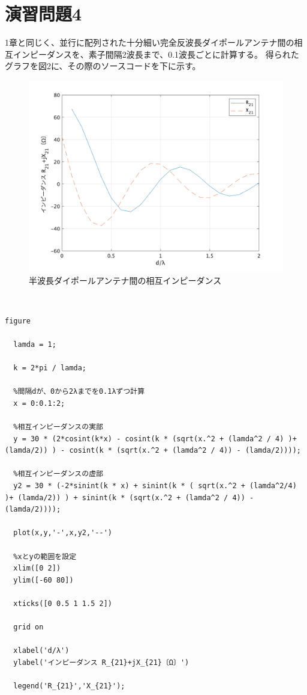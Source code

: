 \documentclass[dvipdfmx,autodetect-engine,titlepage]{jsarticle}
\begin{document}
\section{演習問題4}
1章と同じく、並行に配列された十分細い完全反波長ダイポールアンテナ間の相互インピーダンスを、素子間隔2波長まで、0.1波長ごとに計算する。
得られたグラフを図2に、その際のソースコードを下に示す。\\
\begin{figure}[H]
  \centering
  \includegraphics[scale=0.27]{week9_2.png}
  \caption{半波長ダイポールアンテナ間の相互インピーダンス}\label{fig:図2}
\end{figure}
　\\

\begin{lstlisting}[caption=ソースコード,label=1]
  figure 

  lamda = 1;

  k = 2*pi / lamda;
  
  %間隔dが、0から2λまでを0.1λずつ計算
  x = 0:0.1:2;
  
  %相互インピーダンスの実部
  y = 30 * (2*cosint(k*x) - cosint(k * (sqrt(x.^2 + (lamda^2 / 4) )+ (lamda/2)) ) - cosint(k * (sqrt(x.^2 + (lamda^2 / 4)) - (lamda/2))));
  
  %相互インピーダンスの虚部
  y2 = 30 * (-2*sinint(k * x) + sinint(k * ( sqrt(x.^2 + (lamda^2/4) )+ (lamda/2)) ) + sinint(k * (sqrt(x.^2 + (lamda^2 / 4)) - (lamda/2))));
  
  plot(x,y,'-',x,y2,'--')
  
  %xとyの範囲を設定
  xlim([0 2])
  ylim([-60 80])
  
  xticks([0 0.5 1 1.5 2])
  
  grid on
  
  xlabel('d/λ')
  ylabel('インピーダンス R_{21}+jX_{21}〔Ω〕')
  
  legend('R_{21}','X_{21}');
  
    
  \end{lstlisting}
\end{document}
